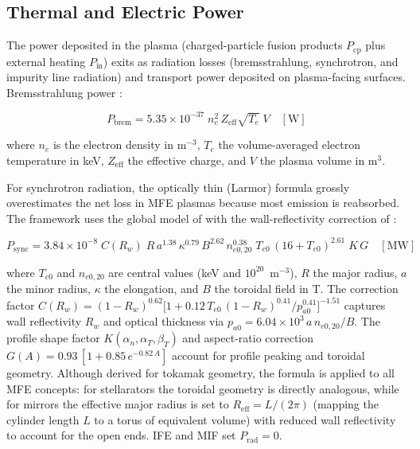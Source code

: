 \documentclass{article}
\begin{document}
\subsection{Thermal and Electric Power}

The power deposited in the plasma (charged-particle fusion products
$P_{\text{cp}}$ plus external heating $P_{\text{in}}$) exits as
radiation losses (bremsstrahlung, synchrotron, and impurity line
radiation) and transport power deposited on plasma-facing surfaces.
Bremsstrahlung power \citep{wesson2011}:

\begin{equation}
\label{eq:p-brem}
P_{\text{brem}} = 5.35 \times 10^{-37}\; n_e^2 \, Z_{\text{eff}}
  \sqrt{T_e}\; V \quad [\text{W}]
\end{equation}

\noindent where $n_e$ is the electron density in m$^{-3}$, $T_e$ the
volume-averaged electron temperature in keV, $Z_{\text{eff}}$ the
effective charge, and $V$ the plasma volume in m$^3$.

For synchrotron radiation, the optically thin (Larmor) formula
grossly overestimates the net loss in MFE plasmas because most
emission is reabsorbed. The framework uses the global model of
\citet{albajar2001} with the wall-reflectivity correction of
\citet{fidone2001}:

\begin{equation}
\label{eq:p-sync}
P_{\text{sync}} = 3.84 \times 10^{-8}\;
  C(R_w)\; R\, a^{1.38}\, \kappa^{0.79}\, B^{2.62}\,
  n_{e0,20}^{0.38}\; T_{e0}\,(16 + T_{e0})^{2.61}\;
  K\, G
  \quad [\text{MW}]
\end{equation}

\noindent where $T_{e0}$ and $n_{e0,20}$ are central values (keV
and $10^{20}$~m$^{-3}$), $R$ the major radius, $a$ the minor
radius, $\kappa$ the elongation, and $B$ the toroidal field in T.
The correction factor
$C(R_w) = (1-R_w)^{0.62}\bigl[1 + 0.12\,T_{e0}\,(1-R_w)^{0.41}/
p_{a0}^{0.41}\bigr]^{-1.51}$
captures wall reflectivity $R_w$ and optical thickness via
$p_{a0} = 6.04 \times 10^3\, a\, n_{e0,20}/B$.
The profile shape factor $K(\alpha_n, \alpha_T, \beta_T)$ and
aspect-ratio correction $G(A) = 0.93\,[1 + 0.85\,e^{-0.82\,A}]$
account for profile peaking and toroidal geometry.
Although derived for tokamak geometry, the formula is applied to all
MFE concepts: for stellarators the toroidal geometry is directly
analogous, while for mirrors the effective major radius is set to
$R_{\text{eff}} = L/(2\pi)$ (mapping the cylinder length $L$ to a
torus of equivalent volume) with reduced wall reflectivity to account
for the open ends. IFE and MIF set $P_{\text{rad}} = 0$.
\end{document}
